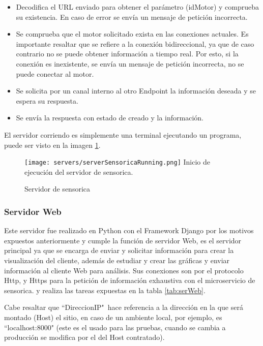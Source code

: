     \begin{itemize}
        \item Decodifica el URL enviado para obtener el parámetro (idMotor) y
            comprueba su existencia. En caso de error se envía un mensaje
            de petición incorrecta.
        \item Se comprueba que el motor solicitado exista en las conexiones
            actuales. Es importante resaltar que se refiere a la conexión
            bidireccional, ya que de caso contrario no se puede obtener información
            a tiempo real. Por esto, si la conexión es inexistente, se envía un
            mensaje de petición incorrecta, no se puede conectar al motor.
        \item Se solicita por un canal interno al otro Endpoint la información
            deseada y se espera su respuesta.
        \item Se envía la respuesta con estado de creado y la información.
    \end{itemize}

    El servidor corriendo es simplemente una terminal ejecutando un programa,
    puede ser visto en la imagen \ref{img:serverSensoricaRunning}.

	\begin{figure}[htb]
		\centering
        \caption{Servidor de sensorica}
        \texttt{[image: servers/serverSensoricaRunning.png]}
        Inicio de ejecución del servidor de sensorica.    \label{img:serverSensoricaRunning}
	\end{figure}

    \subsubsection{Servidor Web}
    Este servidor fue realizado en Python con el Framework Django
    por los motivos expuestos anteriormente y cumple la función de servidor Web,
    es el servidor principal ya que se encarga de enviar y solicitar información
    para crear la visualización del cliente, además de estudiar y crear las gráficas
    y enviar información al cliente Web para análisis.
    Sus conexiones son por el protocolo Http, y Https para la petición de información
    exhaustiva con el microservicio de sensorica. y realiza las tareas expuestas
    en la tabla \ref{tab:serWeb}.

    Cabe resaltar que ``DireccionIP"\ hace referencia a la dirección en la
    que será montado (Host) el sitio, en caso de un ambiente local, por
    ejemplo, es ``localhost:8000" (este es el usado para las pruebas,
    cuando se cambia a producción se modifica por el del Host contratado).

